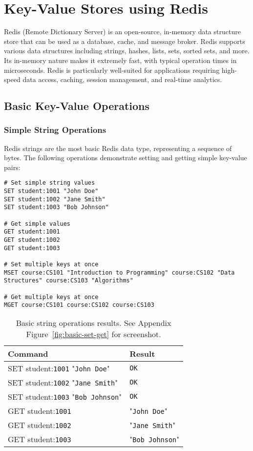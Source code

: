 \chapter{Key-Value Stores using Redis}

Redis (Remote Dictionary Server) is an open-source, in-memory data structure store that can be used as a database, cache, and message broker. Redis supports various data structures including strings, hashes, lists, sets, sorted sets, and more. Its in-memory nature makes it extremely fast, with typical operation times in microseconds. Redis is particularly well-suited for applications requiring high-speed data access, caching, session management, and real-time analytics.

\section{Basic Key-Value Operations}

\subsection{Simple String Operations}

Redis strings are the most basic Redis data type, representing a sequence of bytes. The following operations demonstrate setting and getting simple key-value pairs:

\begin{verbatim}
# Set simple string values
SET student:1001 "John Doe"
SET student:1002 "Jane Smith"
SET student:1003 "Bob Johnson"

# Get simple values
GET student:1001
GET student:1002
GET student:1003

# Set multiple keys at once
MSET course:CS101 "Introduction to Programming" course:CS102 "Data Structures" course:CS103 "Algorithms"

# Get multiple keys at once
MGET course:CS101 course:CS102 course:CS103
\end{verbatim}

\begin{table}[H]
  \centering
  \begin{tabular}{|l|l|}
    \hline
    \textbf{Command} & \textbf{Result} \\
    \hline
    SET student:\texttt{1001} "\texttt{John Doe}" & \texttt{OK} \\
    SET student:\texttt{1002} "\texttt{Jane Smith}" & \texttt{OK} \\
    SET student:\texttt{1003} "\texttt{Bob Johnson}" & \texttt{OK} \\
    GET student:\texttt{1001} & "\texttt{John Doe}" \\
    GET student:\texttt{1002} & "\texttt{Jane Smith}" \\
    GET student:\texttt{1003} & "\texttt{Bob Johnson}" \\
    \hline
  \end{tabular}
  \caption{Basic string operations results. See Appendix Figure~\ref{fig:basic-set-get} for screenshot.}
\end{table}


